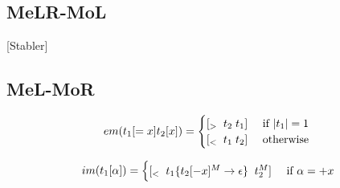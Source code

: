 \documentclass[12pt]{article}
\begin{document}
\begin{landscape}
\newpage 

\subsection{MeLR-MoL}

[Stabler]

\subsection{MeL-MoR}

\begin{equation}
em(t_1[=x]t_2[x])= 
\begin{cases}
[_> \;\; t_2\; t_1] & $ if $ |t_1| = 1 \\ 
[_< \;\; t_1\;t_2] & $ otherwise $
\end{cases}
\end{equation}

\begin{equation}
im(t_1[\alpha]) =
\begin{cases}
[_< \;\; t_1\{t_2[-x]^M \rightarrow \epsilon\} \;\; t_2^M] & $ if $\alpha = +x \\
\end{cases}
\end{equation}



\end{landscape}
\end{document}
